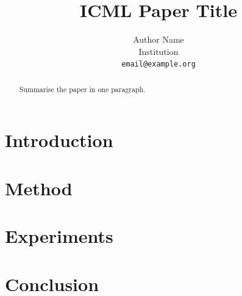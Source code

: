 \documentclass[11pt]{article}
\title{ICML Paper Title}
\author{Author Name \\ Institution \\ \texttt{email@example.org}}
\begin{document}
\maketitle

\begin{abstract}
Summarise the paper in one paragraph.
\end{abstract}

\section{Introduction}

\section{Method}

\section{Experiments}

\section{Conclusion}
\end{document}
